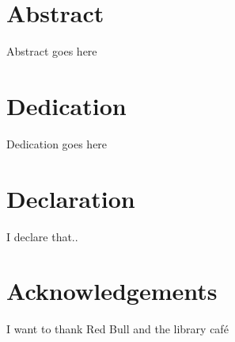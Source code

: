 

\chapter*{Abstract}
Abstract goes here

\chapter*{Dedication}
Dedication goes here

\chapter*{Declaration}
I declare that..

\chapter*{Acknowledgements}
I want to thank Red Bull and the library café

\tableofcontents
